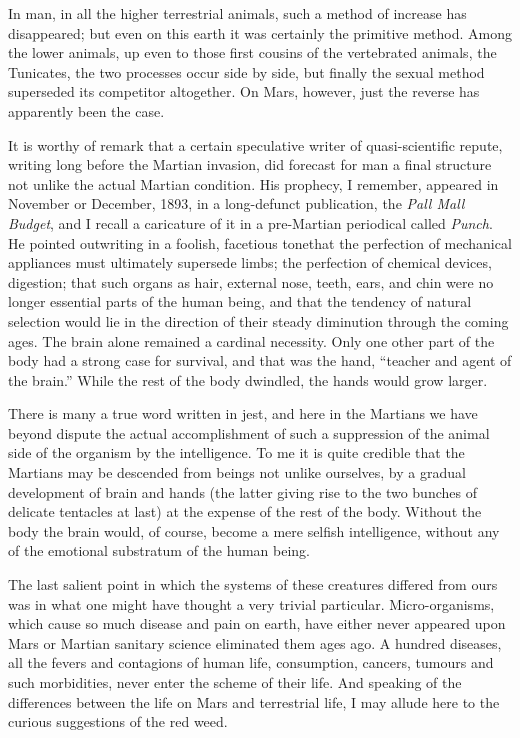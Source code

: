 In man, in all the higher terrestrial animals, such a method of
increase has disappeared; but even on this earth it was certainly
the primitive method. Among the lower animals, up even to those
first cousins of the vertebrated animals, the Tunicates, the two
processes occur side by side, but finally the sexual method
superseded its competitor altogether. On Mars, however, just the
reverse has apparently been the case.

It is worthy of remark that a certain speculative writer of
quasi-scientific repute, writing long before the Martian invasion,
did forecast for man a final structure not unlike the actual
Martian condition. His prophecy, I remember, appeared in November
or December, 1893, in a long-defunct publication, the
\emph{Pall Mall Budget}, and I recall a caricature of it in a
pre-Martian periodical called \emph{Punch}. He pointed out\dash{}writing
in a foolish, facetious tone\dash{}that the perfection of mechanical
appliances must ultimately supersede limbs; the perfection of
chemical devices, digestion; that such organs as hair, external
nose, teeth, ears, and chin were no longer essential parts of the
human being, and that the tendency of natural selection would lie
in the direction of their steady diminution through the coming
ages. The brain alone remained a cardinal necessity. Only one other
part of the body had a strong case for survival, and that was the
hand, ``teacher and agent of the brain.'' While the rest of the body
dwindled, the hands would grow larger.

There is many a true word written in jest, and here in the Martians
we have beyond dispute the actual accomplishment of such a
suppression of the animal side of the organism by the intelligence.
To me it is quite credible that the Martians may be descended from
beings not unlike ourselves, by a gradual development of brain and
hands (the latter giving rise to the two bunches of delicate
tentacles at last) at the expense of the rest of the body. Without
the body the brain would, of course, become a mere selfish
intelligence, without any of the emotional substratum of the human
being.

The last salient point in which the systems of these creatures
differed from ours was in what one might have thought a very
trivial particular. Micro-organisms, which cause so much disease
and pain on earth, have either never appeared upon Mars or Martian
sanitary science eliminated them ages ago. A hundred diseases, all
the fevers and contagions of human life, consumption, cancers,
tumours and such morbidities, never enter the scheme of their life.
And speaking of the differences between the life on Mars and
terrestrial life, I may allude here to the curious suggestions of
the red weed.

